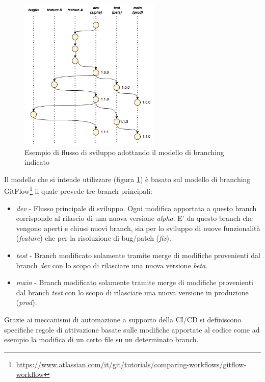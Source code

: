 \begin{figure}[H]
\centering
\includegraphics[width=0.6\textwidth]{img/tesi-13-branching.drawio.png}
\caption{Esempio di flusso di sviluppo adottando il modello di branching indicato}
\label{branching}
\end{figure}

Il modello che si intende utilizzare (figura \ref{branching}) è basato sul modello di branching GitFlow\footnote{\url{https://www.atlassian.com/it/git/tutorials/comparing-workflows/gitflow-workflow}} il quale prevede tre branch principali:
\begin{itemize}
    \item \textit{dev} - Flusso principale di sviluppo. Ogni modifica apportata a questo branch corrisponde al rilascio di una nuova versione \textit{alpha}. E' da questo branch che vengono aperti e chiusi nuovi branch, sia per lo sviluppo di nuove funzionalità (\textit{feature}) che per la risoluzione di bug/patch (\textit{fix}).
    \item \textit{test} - Branch modificato solamente tramite merge di modifiche provenienti dal branch \textit{dev} con lo scopo di rilasciare una nuova versione \textit{beta}.
    \item \textit{main} - Branch modificato solamente tramite merge di modifiche provenienti dal branch \textit{test} con lo scopo di rilasciare una nuova versione in produzione (\textit{prod}).
\end{itemize}

Grazie ai meccanismi di automazione a supporto della CI/CD si definiscono specifiche regole di attivazione basate sulle modifiche apportate al codice come ad esempio la modifica di un certo file su un determinato branch.

